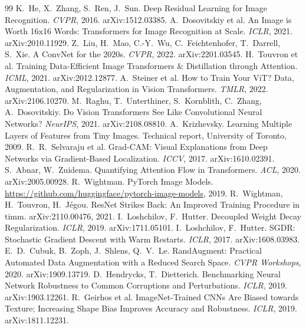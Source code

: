 \documentclass[10pt,a4paper]{article}
\begin{document}
\small
\begin{thebibliography}{99}
\setlength{\itemsep}{0pt}
 K.~He, X.~Zhang, S.~Ren, J.~Sun. Deep Residual Learning for Image
Recognition. \emph{CVPR}, 2016. arXiv:1512.03385.
 A.~Dosovitskiy et al. An Image is Worth 16x16 Words: Transformers for
Image Recognition at Scale. \emph{ICLR}, 2021. arXiv:2010.11929.
 Z.~Liu, H.~Mao, C.-Y.~Wu, C.~Feichtenhofer, T.~Darrell, S.~Xie. A ConvNet
for the 2020s. \emph{CVPR}, 2022. arXiv:2201.03545.
 H.~Touvron et al. Training Data-Efficient Image Transformers \&
Distillation through Attention. \emph{ICML}, 2021. arXiv:2012.12877.
 A.~Steiner et al. How to Train Your ViT? Data, Augmentation, and
Regularization in Vision Transformers. \emph{TMLR}, 2022. arXiv:2106.10270.
 M.~Raghu, T.~Unterthiner, S.~Kornblith, C.~Zhang, A.~Dosovitskiy. Do Vision
Transformers See Like Convolutional Neural Networks? \emph{NeurIPS}, 2021. arXiv:2108.08810.
 A.~Krizhevsky. Learning Multiple Layers of Features from Tiny Images.
Technical report, University of Toronto, 2009.
 R.~R.~Selvaraju et al. Grad-CAM: Visual Explanations from Deep
Networks via Gradient-Based Localization. \emph{ICCV}, 2017. arXiv:1610.02391.
 S.~Abnar, W.~Zuidema. Quantifying Attention Flow in Transformers.
\emph{ACL}, 2020. arXiv:2005.00928.
 R.~Wightman. PyTorch Image Models.
\url{https://github.com/huggingface/pytorch-image-models}, 2019.
 R.~Wightman, H.~Touvron, H.~J\'egou. ResNet Strikes Back: An
Improved Training Procedure in timm. arXiv:2110.00476, 2021.
 I.~Loshchilov, F.~Hutter. Decoupled Weight Decay Regularization.
\emph{ICLR}, 2019. arXiv:1711.05101.
 I.~Loshchilov, F.~Hutter. SGDR: Stochastic Gradient Descent with Warm
Restarts. \emph{ICLR}, 2017. arXiv:1608.03983.
 E.~D.~Cubuk, B.~Zoph, J.~Shlens, Q.~V.~Le. RandAugment: Practical
Automated Data Augmentation with a Reduced Search Space. \emph{CVPR Workshops}, 2020.
arXiv:1909.13719.
 D.~Hendrycks, T.~Dietterich. Benchmarking Neural Network Robustness
to Common Corruptions and Perturbations. \emph{ICLR}, 2019. arXiv:1903.12261.
 R.~Geirhos et al. ImageNet-Trained CNNs Are Biased towards Texture;
Increasing Shape Bias Improves Accuracy and Robustness. \emph{ICLR}, 2019. arXiv:1811.12231.
\end{thebibliography}
\end{document}
